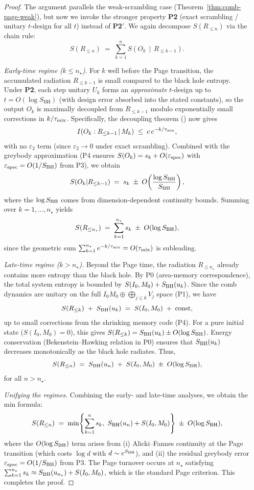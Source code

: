 \documentclass[11pt,a4paper]{article}
\newcommand{\Ptwo}{\textbf{P2}\xspace}
\newcommand{\PtwoPrime}{\textbf{P2$'$}\xspace}
\newcommand{\SBH}{\ensuremath{S_{\mathrm{BH}}}}
\theoremstyle{plain}
\theoremstyle{definition}
\theoremstyle{remark}
\begin{document}
\begin{proof}
The argument parallels the weak-scrambling case (Theorem~\ref{thm:comb-page-weak}), but now we invoke the stronger property \Ptwo{} (exact scrambling / unitary $t$-design for all $t$) instead of \PtwoPrime. We again decompose $S(R_{\le n})$ via the chain rule:
\[
S(R_{\le n}) \;=\; \sum_{k=1}^n S\!\left(O_k \,\middle|\, R_{\le k-1}\right).
\]

\emph{Early-time regime ($k\le n_\star$).}
For $k$ well before the Page transition, the accumulated radiation $R_{\le k-1}$ is small compared to the black hole entropy. Under \Ptwo{}, each step unitary $U_k$ forms an \emph{approximate} $t$-design up to $t = O(\log \SBH)$ (with design error absorbed into the stated constants), so the output $O_k$ is maximally decoupled from $R_{\le k-1}$ modulo exponentially small corrections in $k/\tau_{\rm mix}$. Specifically, the decoupling theorem () now gives
\[
I\!\left(O_k:R_{\le k-1}\,|\,M_k\right) \;\le\; c\,e^{-k/\tau_{\rm mix}},
\]
with no $\varepsilon_2$ term (since $\varepsilon_2\to0$ under exact scrambling). Combined with the greybody approximation (P4 ensures $S(O_k)=s_k+O(\varepsilon_{\rm spec})$ with $\varepsilon_{\rm spec}=O(1/S_{\rm BH})$ from P3), we obtain
\[
S(O_k|R_{\le k-1}) \;=\; s_k \;\pm\; O\!\left(\frac{\log S_{\rm BH}}{S_{\rm BH}}\right),
\]
where the $\log S_{\rm BH}$ comes from dimension-dependent continuity bounds. Summing over $k=1,\ldots,n_\star$ yields
\[
S(R_{\le n_\star}) \;=\; \sum_{k=1}^{n_\star} s_k \;\pm\; O(\log S_{\rm BH}),
\]
since the geometric sum $\sum_{k=1}^{n_\star} e^{-k/\tau_{\rm mix}}=O(\tau_{\rm mix})$ is subleading.

\emph{Late-time regime ($k> n_\star$).}
Beyond the Page time, the radiation $R_{\le n_\star}$ already contains more entropy than the black hole. By P0 (area-memory correspondence), the total system entropy is bounded by $S(I_0,M_0)+S_{\rm BH}(u_k)$. Since the comb dynamics are unitary on the full $I_0M_0\oplus \bigoplus_{j\le k} V_j$ space (P1), we have
\[
S(R_{\le k}) \;+\; S_{\rm BH}(u_k) \;=\; S(I_0,M_0) \;+\; \text{const},
\]
up to small corrections from the shrinking memory code (P4). For a pure initial state ($S(I_0,M_0)=0$), this gives $S(R_{\le k})=S_{\rm BH}(u_k)\pm O(\log S_{\rm BH})$. Energy conservation (Bekenstein--Hawking relation in P0) ensures that $S_{\rm BH}(u_k)$ decreases monotonically as the black hole radiates. Thus,
\[
S(R_{\le n}) \;=\; S_{\rm BH}(u_n) \;+\; S(I_0,M_0) \;\pm\; O(\log S_{\rm BH}),
\]
for all $n>n_\star$.

\emph{Unifying the regimes.}
Combining the early- and late-time analyses, we obtain the min formula:
\[
S(R_{\le n}) \;=\; \min\!\left\{\sum_{k=1}^n s_k,\ S_{\rm BH}(u_n)+S(I_0,M_0)\right\} \;\pm\; O(\log S_{\rm BH}),
\]
where the $O(\log S_{\rm BH})$ term arises from (i) Alicki--Fannes continuity at the Page transition (which costs $\log d$ with $d\sim e^{S_{\rm BH}}$), and (ii) the residual greybody error $\varepsilon_{\rm spec}=O(1/S_{\rm BH})$ from P3. The Page turnover occurs at $n_\star$ satisfying $\sum_{k=1}^{n_\star} s_k \approx S_{\rm BH}(u_{n_\star})+S(I_0,M_0)$, which is the standard Page criterion. This completes the proof.
\end{proof}
\end{document}
